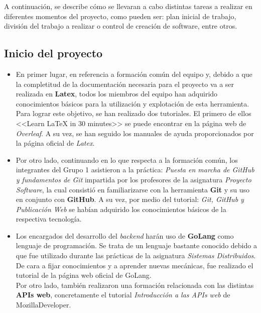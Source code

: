 \documentclass[11pt, a4paper, titlepage]{article}
\begin{document}
A continuación, se describe cómo se llevaran a cabo distintas tareas a realizar en diferentes momentos del proyecto, como pueden ser: plan inicial de trabajo, división del trabajo a realizar o control de creación de software, entre otros.

\subsection{Inicio del proyecto}

\begin{itemize}

\item En primer lugar, en referencia a formación común del equipo y, debido a que la completitud de la documentación necesaria para el proyecto va a ser realizada en \textbf{Latex}, todos los miembros del equipo han adquirido conocimientos básicos para la utilización y explotación de esta herramienta. Para lograr este objetivo, se han realizado dos tutoriales. El primero de ellos <<Learn LaTeX in 30 minutes>>\textsuperscript{\cite{latextutorial1} }se puede encontrar en la página web de \textit{Overleaf}. A su vez, se han seguido los manuales de ayuda proporcionados por la página oficial de \textit{Latex}\textsuperscript{\cite{latextutorial2}}. 

\item Por otro lado, continuando en lo que respecta a la formación común, los integrantes del Grupo 1 asistieron a la práctica: \textit{Puesta en marcha de GitHub y fundamentos de Git} impartida por los profesores de la asignatura \textit{Proyecto Software}, la cual consistió en familiarizarse con la herramienta \textbf{Git} y su uso en conjunto con \textbf{GitHub}. A su vez, por medio del tutorial: \textit{Git, GitHub y Publicación Web}\textsuperscript{\cite{githubtutorial}} se habían adquirido los conocimientos básicos de la respectiva tecnología.

\item Los encargados del desarrollo del \textit{backend} harán uso de \textbf{GoLang} como lenguaje de programación. Se trata de un lenguaje bastante conocido debido a que fue utilizado durante las prácticas de la asignatura \textit{Sistemas Distribuidos}. De cara a fijar conocimientos y a aprender nuevas mecánicas, fue realizado el tutorial de la página web oficial de GoLang. \\
Por otro lado, también realizaron una formación relacionada con las distintas \textbf{APIs web}, concretamente el tutorial \textit{Introducción a las APIs web} de MozillaDeveloper\textsuperscript{\cite{apisweb}}.


\end{itemize}
\end{document}
